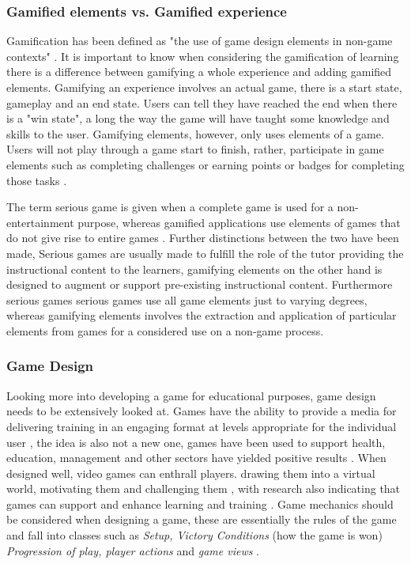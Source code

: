 \documentclass[12pt,a4paper]{article}
\begin{document}
\subsubsection{Gamified elements vs. Gamified experience}
Gamification has been defined as "the use of game design elements in non-game contexts" \cite{deterding2011gamification}. It is important to know when considering the gamification of learning there is a difference between gamifying a whole experience and adding gamified elements. Gamifying an experience involves an actual game, there is a start state, gameplay and an end state. Users can tell they have reached the end when there is a "win state", a long the way the game will have taught some knowledge and skills to the user. Gamifying elements, however, only uses elements of a game. Users will not play through a game start to finish, rather, participate in game elements such as completing challenges or earning points or badges for completing those tasks \cite{kapp2012}.  


The term serious game is given when a complete game is used for a non-entertainment purpose, whereas gamified applications use elements of games that do not give rise to entire games \cite{deterding2011gamification}. Further distinctions between the two have been made, Serious games are usually made to fulfill the role of the tutor providing the instructional content to the learners, gamifying elements on the other hand is designed to augment or support pre-existing instructional content. Furthermore serious games serious games use all game elements just to varying degrees, whereas gamifying elements
involves the extraction and application of particular elements from games for a considered use on a non-game process\cite{landers2014developing}.  

\subsubsection{Game Design} 
Looking more into developing a game for educational purposes, game design needs to be extensively looked at. Games have the ability to provide a media for delivering training in an engaging format at levels appropriate for the individual user \cite{nagarajan2012exploring1}, the idea is also not a new one, games have been used to support health, education, management and other sectors have yielded positive results \cite{prensky2003digital}. When designed well, video games can enthrall players. drawing them into a virtual world, motivating them and challenging them \cite{nagarajan2012exploring2}, with research also indicating that games can support and enhance learning and training \cite{cone2007video}. Game mechanics should be considered when designing a game, these are essentially the rules of the game and fall into classes such as \emph{Setup, Victory Conditions} (how the game is won) \emph{Progression of play, player actions} and  \emph{game views} \cite{nagarajan2012exploring4}.
\end{document}
